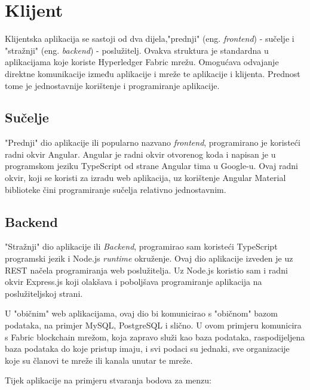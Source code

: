 \documentclass[times, utf8, diplomski]{fer}
\begin{document}
\section{Klijent}

Klijentska aplikacija se sastoji od dva dijela,"prednji" (eng. \textit{frontend}) - sučelje i "stražnji" (eng. \textit{backend}) - poslužitelj. Ovakva struktura je standardna u aplikacijama koje koriste Hyperledger Fabric mrežu.  Omogućava odvajanje direktne komunikacije između aplikacije i mreže te aplikacije i klijenta. Prednost tome je jednostavnije korištenje i programiranje aplikacije. 
\subsection{Sučelje}

"Prednji" dio aplikacije ili popularno nazvano \textit{frontend},  programirano je koristeći radni okvir Angular.  Angular je radni okvir otvorenog koda i napisan je u programskom jeziku TypeScript od strane Angular tima u Google-u. Ovaj radni okvir,  koji se koristi za izradu web aplikacija, uz korištenje Angular Material biblioteke čini programiranje sučelja relativno jednostavnim. 

\subsection{Backend}

"Stražnji" dio aplikacije ili \textit{Backend}, programirao sam koristeći TypeScript programski jezik i Node.js \textit{runtime} okruženje.  Ovaj dio aplikacije izveden je uz REST načela \cite{BATTLE200861} programiranja web poslužitelja. Uz Node.js koristio sam i radni okvir Express.js koji olakšava i poboljšava programiranje aplikacija na poslužiteljskoj strani.%

U "običnim" web aplikacijama, ovaj dio bi komunicirao s "običnom" bazom podataka, na primjer MySQL, PostgreSQL i slično. U ovom primjeru komunicira s Fabric blockchain mrežom, koja zapravo služi kao baza podataka, raspodijeljena baza podataka do koje pristup imaju, i svi podaci su jednaki, sve organizacije koje su članovi te mreže ili kanala unutar te mreže. 

Tijek aplikacije na primjeru stvaranja bodova za menzu:
\end{document}
